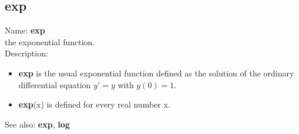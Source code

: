 \subsection{ exp }
\noindent Name: \textbf{exp}\\
the exponential function.\\

\noindent Description: \begin{itemize}

\item \textbf{exp} is the usual exponential function defined as the solution of the
   ordinary differential equation $y'=y$ with $y(0)=1$.

\item \textbf{exp}(x) is defined for every real number x.
\end{itemize}
See also: \textbf{exp}, \textbf{log}
